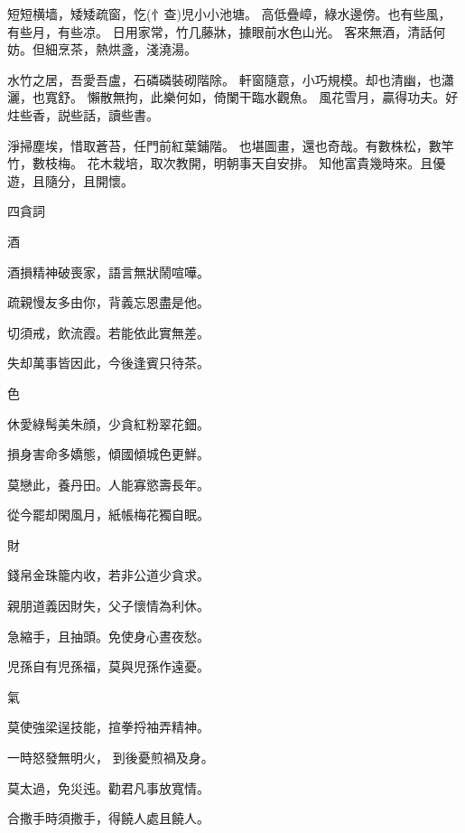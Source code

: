 \begin{showcontents}{}
短短横墙，矮矮疏窗，忔(忄查)児小小池塘。
高低疊嶂，綠水邊傍。也有些風，有些月，有些凉。
日用家常，竹几藤牀，據眼前水色山光。
客來無酒，清話何妨。但細烹茶，熱烘盞，淺澆湯。

水竹之居，吾愛吾盧，石磷磷裝砌階除。
軒窗隨意，小巧規模。却也清幽，也瀟灑，也寬舒。
懶散無拘，此樂何如，倚闌干臨水觀魚。
風花雪月，贏得功夫。好炷些香，説些話，讀些書。

淨掃塵埃，惜取蒼苔，任門前紅葉鋪階。
也堪圖畫，還也奇哉。有數株松，數竿竹，數枝梅。
花木栽培，取次教開，明朝事天自安排。
知他富貴幾時來。且優遊，且隨分，且開懷。



四貪詞

酒

酒損精神破喪家，語言無狀鬧喧嘩。

疏親慢友多由你，背義忘恩盡是他。

切須戒，飲流霞。若能依此實無差。

失却萬事皆因此，今後逢賓只待茶。

色

休愛綠髩美朱顔，少貪紅粉翠花鈿。

損身害命多嬌態，傾國傾城色更鮮。

莫戀此，養丹田。人能寡慾壽長年。

從今罷却閑風月，紙帳梅花獨自眠。

財

錢帛金珠籠内收，若非公道少貪求。

親朋道義因財失，父子懷情為利休。

急縮手，且抽頭。免使身心晝夜愁。

児孫自有児孫福，莫與児孫作遠憂。

氣

莫使強梁逞技能，揎拳捋袖弄精神。

一時怒發無明火，
到後憂煎禍及身。

莫太過，免災迍。勸君凡事放寬情。

合撒手時須撒手，得饒人處且饒人。



\end{showcontents}

